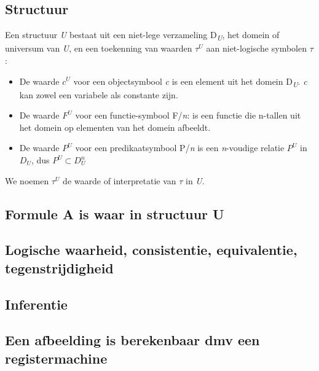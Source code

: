 \documentclass[11pt, a4paper]{article}
\begin{document}
\subsection*{Structuur}
Een structuur \textit{U} bestaat uit een niet-lege verzameling D\textsubscript{\textit{U}}, het domein of universum van \textit{U}, en een toekenning van waarden $\tau^\textit{U}$ aan niet-logische symbolen $\tau$:\begin{itemize}
\item De waarde $c^\textit{U}$ voor een objectsymbool \textit{c} is een element uit het domein D\textsubscript{\textit{U}}. \textit{c} kan zowel een variabele als constante zijn.
\item De waarde $F^\textit{U}$ voor een functie-symbool F/\textit{n}: is een functie die n-tallen uit het domein op elementen van het domein afbeeldt.
\item De waarde $P^\textit{U}$ voor een predikaatsymbool P/\textit{n} is een \textit{n}-voudige relatie $P^\textit{U}$ in $D_\textit{U}$, dus $P^\textit{U} \subset  D_\textit{U}^\textit{n}$
\end{itemize}
We noemen $\tau^\textit{U}$ de waarde of interpretatie van $\tau$ in \textit{U}.

\subsection*{Formule A is waar in structuur U}

\subsection*{Logische waarheid, consistentie, equivalentie, tegenstrijdigheid}

\subsection*{Inferentie}

\subsection*{Een afbeelding is berekenbaar dmv een registermachine}
\end{document}

